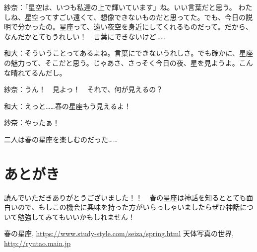 \documentclass[supernova_2023]{subfiles}
\begin{document}
\phantom{a}\par
紗奈：「星空は、いつも私達の上で輝いています」ね。いい言葉だと思う。
わたしね、星空ってすごい遠くて、想像できないものだと思ってた。でも、今日の説明で分かったの。星座って、遠い夜空を身近にしてくれるものだって。だから、なんだかとてもうれしい！　言葉にできないけど……


\phantom{a}\par
和大：そういうことってあるよね。言葉にできないうれしさ。でも確かに、星座の魅力って、そこだと思う。じゃあさ、さっそく今日の夜、星を見ようよ。こんな晴れてるんだし。


\phantom{a}\par
紗奈：うん！　見よっ！　それで、何が見えるの？


\phantom{a}\par
和大：えっと……春の星座もう見えるよ！


\phantom{a}\par
紗奈：やったぁ！　


\phantom{a}\par
二人は春の星座を楽しむのだった……


\phantom{a}\par
{}
{}
\section*{あとがき}
読んでいただきありがとうございました！！　春の星座は神話を知るととても面白いので、もしこの機会に興味を持った方がいらっしゃいましたらぜひ神話について勉強してみてもいいかもしれません！ 

\begin{thebibliography}{1}
   春の星座, \url{https://www.study-style.com/seiza/spring.html}
   天体写真の世界, \url{http://ryutao.main.jp}
\end{thebibliography}
\end{document}
